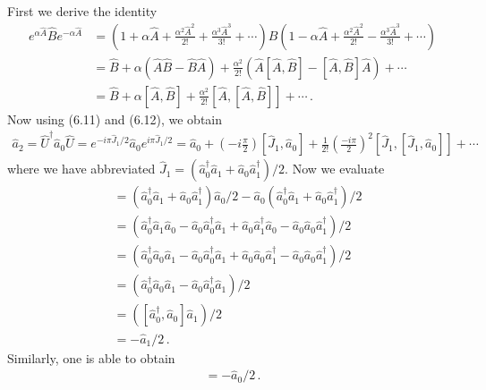 \documentclass[11pt, oneside]{book}
\theoremstyle{break}
\theoremstyle{break}
\begin{document}
\chapter{}
First we derive the identity
\begin{align*}
e^{\alpha \hat{A}}\hat{B}e^{-\alpha \hat{A}} 
&= 
\left(1+ \alpha\hat{A} + \frac{\alpha^2 \hat{A}^2}{2!} + \frac{\alpha^3 \hat{A}^3}{3!}+\cdots\right)\hat{B}\left(1- \alpha\hat{A} + \frac{\alpha^2 \hat{A}^2}{2!} - \frac{\alpha^3 \hat{A}^3}{3!}+\cdots \right) \\
&= 
\hat{B}+ \alpha(\hat{A}\hat{B} - \hat{B}\hat{A}) + \frac{\alpha^2}{2!}\left( \hat{A}[\hat{A},\hat{B}]-[\hat{A},\hat{B}]\hat{A}\right)+\cdots \\
&= \hat{B} + \alpha [\hat{A},\hat{B}] + \frac{\alpha^2}{2!} [\hat{A},[\hat{A},\hat{B}]]+\cdots\,.
\end{align*}
Now using (6.11) and (6.12), we obtain
\begin{align*}
\hat{a}_2 = \hat{U}^\dagger \hat{a}_0 \hat{U} =e^{-i\pi\hat{J}_1 /2}\hat{a}_0 e^{i\pi \hat{J}_1 /2} = \hat{a}_0 +\left(- i \frac{\pi}{2}\right)[\hat{J}_1, \hat{a}_0] + \frac{1}{2!}\left( \frac{-i \pi}{2}\right)^2 [\hat{J}_1, [\hat{J}_1, \hat{a}_0]]+ \cdots
\end{align*}
where we have abbreviated $\hat{J}_1 =(\hat{a}_0^\dagger \hat{a}_1 + \hat{a}_0 \hat{a}_1^\dagger)/2$. Now we evaluate
\begin{align*}
[\hat{J}_1, \hat{a}_0] &= \left(\hat{a}_0^\dagger \hat{a}_1 + \hat{a}_0 \hat{a}_1^\dagger\right)\hat{a}_0 /2 - \hat{a}_0\left(\hat{a}_0^\dagger \hat{a}_1 + \hat{a}_0 \hat{a}_1^\dagger\right) /2  \\
&=\left( \hat{a}_0^\dagger  \hat{a}_1\hat{a}_0 - \hat{a}_0 \hat{a}_0^\dagger \hat{a}_1 + \hat{a}_0 \hat{a}_1^\dagger \hat{a}_0 - \hat{a}_0 \hat{a}_0 \hat{a}_1^\dagger\right)/2\\
&=\left( \hat{a}_0^\dagger \hat{a}_0 \hat{a}_1 - \hat{a}_0 \hat{a}_0^\dagger \hat{a}_1 + \hat{a}_0\hat{a}_0 \hat{a}_1^\dagger  - \hat{a}_0 \hat{a}_0 \hat{a}_1^\dagger\right)/2\\
&=\left( \hat{a}_0^\dagger \hat{a}_0 \hat{a}_1 - \hat{a}_0 \hat{a}_0^\dagger \hat{a}_1 \right)/2\\
&= \left( [\hat{a}_0^\dagger, \hat{a}_0]\hat{a}_1\right) /2 \\
&= -\hat{a}_1 /2\,.
\end{align*}
Similarly, one is able to obtain
\begin{align*}
[\hat{J}_1,\hat{a}_1] = -\hat{a}_0 /2\,.
\end{align*}
\end{document}
